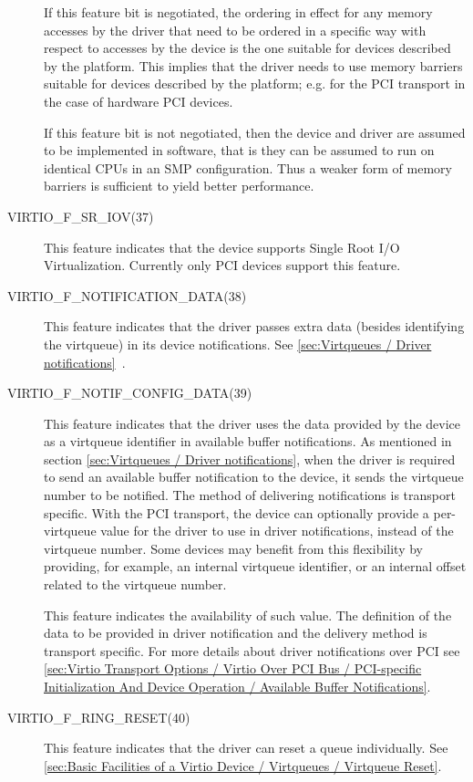 \begin{description}
  If this feature bit is negotiated, the ordering in effect for any
  memory accesses by the driver that need to be ordered in a specific way
  with respect to accesses by the device is the one suitable for devices
  described by the platform. This implies that the driver needs to use
  memory barriers suitable for devices described by the platform; e.g.
  for the PCI transport in the case of hardware PCI devices.

  If this feature bit is not negotiated, then the device
  and driver are assumed to be implemented in software, that is
  they can be assumed to run on identical CPUs
  in an SMP configuration.
  Thus a weaker form of memory barriers is sufficient
  to yield better performance.
  \item[VIRTIO_F_SR_IOV(37)] This feature indicates that
  the device supports Single Root I/O Virtualization.
  Currently only PCI devices support this feature.
  \item[VIRTIO_F_NOTIFICATION_DATA(38)] This feature indicates
  that the driver passes extra data (besides identifying the virtqueue)
  in its device notifications.
  See \ref{sec:Virtqueues / Driver notifications}~.

  \item[VIRTIO_F_NOTIF_CONFIG_DATA(39)] This feature indicates that the driver
  uses the data provided by the device as a virtqueue identifier in available
  buffer notifications.
  As mentioned in section \ref{sec:Virtqueues / Driver notifications}, when the
  driver is required to send an available buffer notification to the device, it
  sends the virtqueue number to be notified. The method of delivering
  notifications is transport specific.
  With the PCI transport, the device can optionally provide a per-virtqueue value
  for the driver to use in driver notifications, instead of the virtqueue number.
  Some devices may benefit from this flexibility by providing, for example,
  an internal virtqueue identifier, or an internal offset related to the
  virtqueue number.

  This feature indicates the availability of such value. The definition of the
  data to be provided in driver notification and the delivery method is
  transport specific.
  For more details about driver notifications over PCI see \ref{sec:Virtio Transport Options / Virtio Over PCI Bus / PCI-specific Initialization And Device Operation / Available Buffer Notifications}.

  \item[VIRTIO_F_RING_RESET(40)] This feature indicates
  that the driver can reset a queue individually.
  See \ref{sec:Basic Facilities of a Virtio Device / Virtqueues / Virtqueue Reset}.

\end{description}

